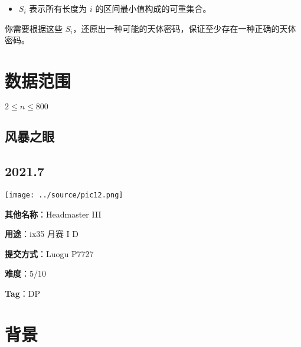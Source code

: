 \documentclass[a4paper,10pt]{article}
\begin{document}
\begin{itemize}
\item $S_i$ 表示所有长度为 $i$ 的区间最小值构成的可重集合。
\end{itemize}

你需要根据这些 $S_i$，还原出一种可能的天体密码，保证至少存在一种正确的天体密码。

\section*{数据范围}

$2\leq n\leq 800$

\newpage

\vspace*{\fill}
\begin{center}

\section{风暴之眼}

\subsection*{2021.7}

\vspace{10pt}

\texttt{[image: ../source/pic12.png]}

\vspace{10pt}

\textbf{其他名称}：Headmaster III

\vspace{10pt}

\textbf{用途}：ix35 月赛 I D

\vspace{10pt}

\textbf{提交方式}：Luogu P7727

\vspace{10pt}

\textbf{难度}：$5/10$

\vspace{10pt}

\textbf{Tag}：DP

\end{center}
\vspace*{\fill}

\newpage

\section*{背景}
\end{document}
